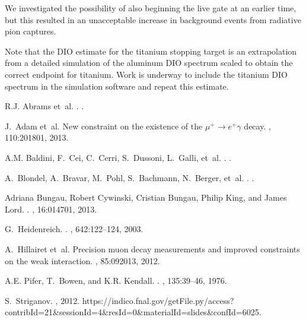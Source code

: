 \begin{thebibliography}{99}
 We investigated the possibility of also
beginning the live gate at an earlier time, but this resulted in an
unacceptable increase in background events from radiative pion
captures.


 Note that the DIO estimate for the titanium
stopping target is an extrapolation from a detailed simulation of the
aluminum DIO spectrum scaled to obtain the correct endpoint for
titanium.  Work is underway to include the titanium DIO spectrum in
the simulation software and repeat this estimate.


R.J. Abrams et~al.
.
.

J.~Adam et~al.
\newblock New constraint on the existence of the $\mu^{+}\rightarrow
  {e}^{+}\gamma$ decay.
, 110:201801, 2013.

A.M. Baldini, F.~Cei, C.~Cerri, S.~Dussoni, L.~Galli, et~al.
.
.

A.~Blondel, A.~Bravar, M.~Pohl, S.~Bachmann, N.~Berger, et~al.
.
.

Adriana Bungau, Robert Cywinski, Cristian Bungau, Philip King, and James Lord.
.
, 16:014701, 2013.

G.~Heidenreich.
.
, 642:122--124, 2003.

A.~Hillairet et~al.
\newblock Precision muon decay measurements and improved constraints on the
  weak interaction.
, 85:092013, 2012.

A.E. Pifer, T.~Bowen, and K.R. Kendall.
.
, 135:39--46, 1976.

S.~Striganov.
, 2012.
\newblock
  https://indico.fnal.gov/getFile.py/access?contribId=21\&sessionId=4\&resId=0\&materialId=slides\&confId=6025.


\end{thebibliography}
